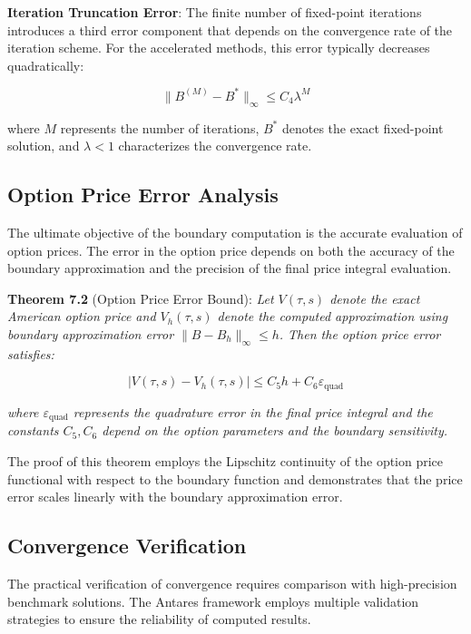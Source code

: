 \documentclass[
  american,
  11pt,
  11pt,
  letterpaper,
  onecolumn]{article}
\begin{document}
\textbf{Iteration Truncation Error}: The finite number of fixed-point
iterations introduces a third error component that depends on the
convergence rate of the iteration scheme. For the accelerated methods,
this error typically decreases quadratically:

\[\|B^{(M)} - B^*\|_{\infty} \leq C_4 \lambda^M \tag{7.3}\]

where \(M\) represents the number of iterations, \(B^*\) denotes the
exact fixed-point solution, and \(\lambda < 1\) characterizes the
convergence rate.

\subsection{Option Price Error
Analysis}\label{option-price-error-analysis}

The ultimate objective of the boundary computation is the accurate
evaluation of option prices. The error in the option price depends on
both the accuracy of the boundary approximation and the precision of the
final price integral evaluation.

\textbf{Theorem 7.2} (Option Price Error Bound): \emph{Let \(V(\tau,s)\)
denote the exact American option price and \(V_h(\tau,s)\) denote the
computed approximation using boundary approximation error
\(\|B - B_h\|_{\infty} \leq h\). Then the option price error satisfies:}

\[|V(\tau,s) - V_h(\tau,s)| \leq C_5 h + C_6 \varepsilon_{\text{quad}} \tag{7.4}\]

\emph{where \(\varepsilon_{\text{quad}}\) represents the quadrature
error in the final price integral and the constants \(C_5, C_6\) depend
on the option parameters and the boundary sensitivity.}

The proof of this theorem employs the Lipschitz continuity of the option
price functional with respect to the boundary function and demonstrates
that the price error scales linearly with the boundary approximation
error.

\subsection{Convergence Verification}\label{convergence-verification}

The practical verification of convergence requires comparison with
high-precision benchmark solutions. The Antares framework employs
multiple validation strategies to ensure the reliability of computed
results.
\end{document}
